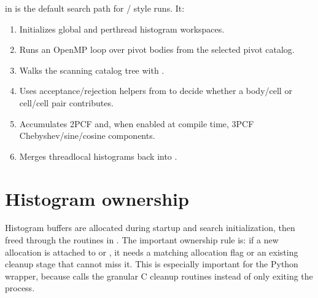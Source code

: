 \documentclass[letterpaper,10pt,english]{sphinxmanual}
\begin{document}
\sphinxAtStartPar
{} in  is the default search path
for / style runs. It:
\begin{enumerate}
%
\item {} 
\sphinxAtStartPar
Initializes global and per\sphinxhyphen{}thread histogram workspaces.

\item {} 
\sphinxAtStartPar
Runs an OpenMP loop over pivot bodies from the selected pivot catalog.

\item {} 
\sphinxAtStartPar
Walks the scanning catalog tree with .

\item {} 
\sphinxAtStartPar
Uses acceptance/rejection helpers from  to decide
whether a body/cell or cell/cell pair contributes.

\item {} 
\sphinxAtStartPar
Accumulates 2PCF and, when enabled at compile time, 3PCF Chebyshev/sine/cosine
components.

\item {} 
\sphinxAtStartPar
Merges thread\sphinxhyphen{}local histograms back into .

\end{enumerate}


\section{Histogram ownership}
\label{\detokenize{code_structure:histogram-ownership}}
\sphinxAtStartPar
Histogram buffers are allocated during startup and search initialization, then
freed through the  routines in .
The important ownership rule is: if a new allocation is attached to  or
, it needs a matching allocation flag or an existing cleanup stage that
cannot miss it. This is especially important for the Python wrapper, because
 calls the granular C cleanup routines instead of only
exiting the process.
\end{document}
